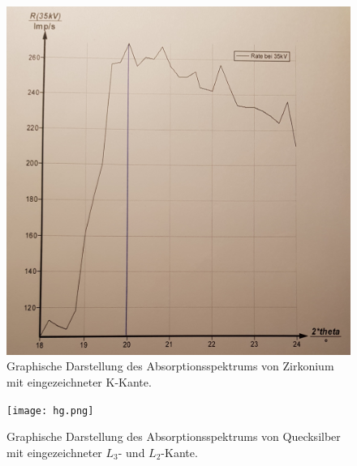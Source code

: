 \begin{figure}[H]
  \centering
  \includegraphics{zirkonium.png}
  \caption{Graphische Darstellung des Absorptionsspektrums von Zirkonium mit eingezeichneter K-Kante.}
  \label{fig:plot}
\end{figure}

\begin{figure}[H]
  \centering
  \texttt{[image: hg.png]}
  \caption{Graphische Darstellung des Absorptionsspektrums von Quecksilber mit eingezeichneter $L_\text{3}$- und $L_\text{2}$-Kante.}
  \label{fig:plot}
\end{figure}